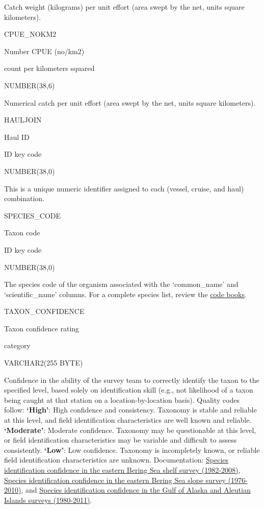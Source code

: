 \documentclass[
  letterpaper,
  oneside,
  open=any]{scrbook}
\begin{document}
Catch weight (kilograms) per unit effort (area swept by the net, units
square kilometers).

CPUE\_NOKM2

Number CPUE (no/km2)

count per kilometers squared

NUMBER(38,6)

Numerical catch per unit effort (area swept by the net, units square
kilometers).

HAULJOIN

Haul ID

ID key code

NUMBER(38,0)

This is a unique numeric identifier assigned to each (vessel, cruise,
and haul) combination.

SPECIES\_CODE

Taxon code

ID key code

NUMBER(38,0)

The species code of the organism associated with the `common\_name' and
`scientific\_name' columns. For a complete species list, review the
\href{https://www.fisheries.noaa.gov/resource/document/groundfish-survey-species-code-manual-and-data-codes-manual}{code
books}.

TAXON\_CONFIDENCE

Taxon confidence rating

category

VARCHAR2(255 BYTE)

Confidence in the ability of the survey team to correctly identify the
taxon to the specified level, based solely on identification skill
(e.g., not likelihood of a taxon being caught at that station on a
location-by-location basis). Quality codes follow: \textbf{`High'}: High
confidence and consistency. Taxonomy is stable and reliable at this
level, and field identification characteristics are well known and
reliable. \textbf{`Moderate'}: Moderate confidence. Taxonomy may be
questionable at this level, or field identification characteristics may
be variable and difficult to assess consistently. \textbf{`Low'}: Low
confidence. Taxonomy is incompletely known, or reliable field
identification characteristics are unknown. Documentation:
\href{http://apps-afsc.fisheries.noaa.gov/Publications/ProcRpt/PR2009-04.pdf}{Species
identification confidence in the eastern Bering Sea shelf survey
(1982-2008)},
\href{http://apps-afsc.fisheries.noaa.gov/Publications/ProcRpt/PR2014-05.pdf}{Species
identification confidence in the eastern Bering Sea slope survey
(1976-2010)}, and
\href{http://apps-afsc.fisheries.noaa.gov/Publications/ProcRpt/PR2014-01.pdf}{Species
identification confidence in the Gulf of Alaska and Aleutian Islands
surveys (1980-2011)}.
\end{document}
